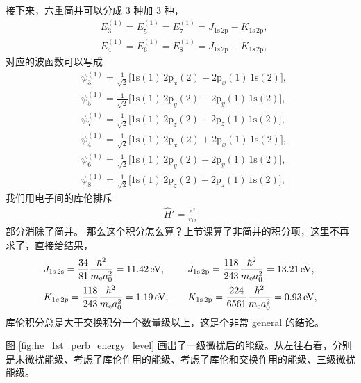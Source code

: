 接下来，六重简并可以分成 3 种加 3 种，
\begin{align}
&E_3^{(1)} = E_5^{(1)} = E_7^{(1)} = J_{\mathrm{1s\,2p}} - K_{\mathrm{1s\,2p}}, \\
&E_4^{(1)} = E_6^{(1)} = E_8^{(1)} = J_{\mathrm{1s\,2p}} - K_{\mathrm{1s\,2p}}, 
\end{align}
对应的波函数可以写成 %
\begin{align}
    & \psi_3^{(1)} = \frac1{\sqrt 2} \big[
    \mathrm{1s(1)\,2p}_x(2) - \mathrm{2p}_x(1)\,\mathrm{1s}(2) 
    \big], \\
    & \psi_5^{(1)} = \frac1{\sqrt 2} \big[
    \mathrm{1s(1)\,2p}_y(2) - \mathrm{2p}_y(1)\,\mathrm{1s}(2) 
    \big], \\
    & \psi_7^{(1)} = \frac1{\sqrt 2} \big[
    \mathrm{1s(1)\,2p}_z(2) - \mathrm{2p}_z(1)\,\mathrm{1s}(2) 
    \big], 
\end{align}
\begin{align}
    & \psi_4^{(1)} = \frac1{\sqrt 2} \big[
    \mathrm{1s(1)\,2p}_x(2) + \mathrm{2p}_x(1)\,\mathrm{1s}(2) 
    \big], \\
    & \psi_6^{(1)} = \frac1{\sqrt 2} \big[
    \mathrm{1s(1)\,2p}_y(2) + \mathrm{2p}_y(1)\,\mathrm{1s}(2) 
    \big], \\
    & \psi_8^{(1)} = \frac1{\sqrt 2} \big[
    \mathrm{1s(1)\,2p}_z(2) + \mathrm{2p}_z(1)\,\mathrm{1s}(2) 
    \big], 
\end{align}
我们用电子间的库伦排斥
\begin{align}
    \hat H' = \frac{e^2}{r_{12}}
\end{align}
部分消除了简并。
那么这个积分怎么算？上节课算了非简并的积分项，这里不再求了，直接给结果，
\begin{alignat}{2}
    &J_{\text{1s\,2s}} = \frac{34}{81} \frac{\hbar^2}{m_{\mathrm e}a_0^2} = \SI{11.42}{\electronvolt}, \quad
    &&J_{\text{1s\,2p}} = \frac{118}{243} \frac{\hbar^2}{m_{\mathrm e}a_0^2} = \SI{13.21}{\electronvolt},\\
    &K_{1s\,2p} = \frac{118}{243} \frac{\hbar^2}{m_{\mathrm e}a_0^2} = \SI{1.19}{\electronvolt}, \quad
    &&K_{\text{1s\,2p}} = \frac{224}{6561} \frac{\hbar^2}{m_{\mathrm e}a_0^2} = \SI{0.93}{\electronvolt},
\end{alignat}
库伦积分总是大于交换积分一个数量级以上，这是个非常 general 的结论。

图 \ref{fig:he_1st_perb_energy_level} 画出了一级微扰后的能级。从左往右看，分别是未微扰能级、考虑了库伦作用的能级、考虑了库伦和交换作用的能级、三级微扰能级。

